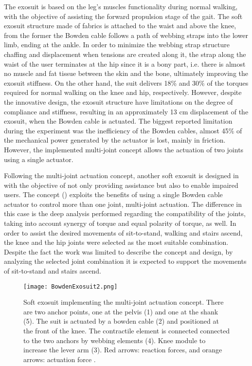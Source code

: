 The exosuit is based on the leg's muscles functionality during normal walking, with the objective of assisting the forward propulsion stage of the gait. The soft exosuit structure made of fabrics is attached to the waist and above the knee, from the former the Bowden cable follows a path of webbing straps into the lower limb, ending at the ankle. In order to minimize the webbing strap structure chaffing and displacement when tensions are created along it, the strap along the waist of the user terminates at the hip since it is a bony part, i.e. there is almost no muscle and fat tissue between the skin and the bone, ultimately improving the exosuit stiffness. On the other hand, the suit delivers 18\% and 30\% of the torques required for normal walking on the knee and hip, respectively. However, despite the innovative design, the exosuit structure have limitations on the degree of compliance and stiffness, resulting in an approximately 13 cm displacement of the exosuit, when the Bowden cable is actuated. The biggest reported limitation during the experiment was the inefficiency of the Bowden cables, almost 45\% of the mechanical power generated by the actuator is lost, mainly in friction. However, the implemented multi-joint concept allows the actuation of two joints using a single actuator.

Following the multi-joint actuation concept, another soft exosuit is designed in \cite{Bartenbach2015} with the objective of not only providing assistance but also to enable impaired users. The concept () exploits the benefits of using a single Bowden cable actuator to control more than one joint, multi-joint actuation. The difference in this case is the deep analysis performed regarding the compatibility of the joints, taking into account synergy of torque and equal polarity of torque, as well. In order to assist the desired movements of sit-to-stand, walking and stairs ascend, the knee and the hip joints were selected as the most suitable combination. Despite the fact the work was limited to describe the concept and design, by analyzing the selected joint combination it is expected to support the movements of sit-to-stand and stairs ascend.

\begin{figure}[hbt!]
    \centering
    \texttt{[image: BowdenExosuit2.png]}
    \caption{Soft exosuit implementing the multi-joint actuation concept. There are two anchor points, one at the pelvis (1) and one at the shank (5). The suit is actuated by a bowden cable (2) and positioned at the front of the knee. The contractile element is connected connected to the two anchors by webbing elements (4). Knee module to increase the lever arm (3). Red arrows: reaction forces, and orange arrows: actuation force \cite{Bartenbach2015}. }
    \label{fig:bowden_exo2}
\end{figure}

